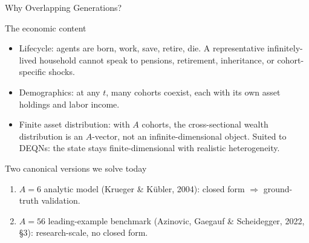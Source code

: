 \documentclass[aspectratio=169,11pt]{beamer}
\newcommand{\emphc}[1]{\textcolor{harvardcrimson}{#1}}
\begin{document}
\begin{frame}{Why Overlapping Generations?}
\footnotesize
\begin{block}{The economic content}
\vspace{-3pt}\begin{itemize}\itemsep2pt
    \item \emphc{Lifecycle:} agents are born, work, save, retire, die.  A representative infinitely-lived household cannot speak to pensions, retirement, inheritance, or cohort-specific shocks.
    \item \emphc{Demographics:} at any $t$, many cohorts coexist, each with its own asset holdings and labor income.
    \item \emphc{Finite asset distribution:} with $A$ cohorts, the cross-sectional wealth distribution is an $A$-vector, not an infinite-dimensional object.  \emphc{Suited to DEQNs:} the state stays finite-dimensional with realistic heterogeneity.
\end{itemize}
\end{block}
\vspace{-3pt}
\begin{block}{Two canonical versions we solve today}
\vspace{-3pt}\begin{enumerate}\itemsep1pt
    \item $A=6$ analytic model (Krueger \& K\"ubler, 2004): closed form $\Rightarrow$ ground-truth validation.
    \item $A=56$ leading-example benchmark (Azinovic, Gaegauf \& Scheidegger, 2022, \S 3): research-scale, no closed form.
\end{enumerate}
\end{block}
\end{frame}
\end{document}
